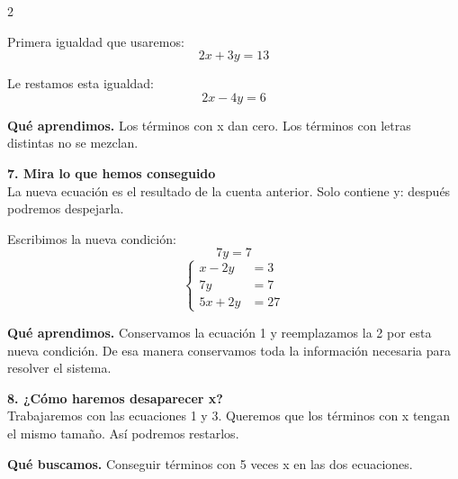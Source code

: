 \documentclass[11pt,a4paper,landscape]{article}
\begin{document}
\begin{multicols*}{2}
\begin{minipage}{\linewidth}
\par{}\par\smallskip
\par\smallskip Primera igualdad que usaremos:
\[2x + 3y = 13\]
\par\smallskip Le restamos esta igualdad:
\[2x - 4y = 6\]
\par\smallskip\textbf{Qué aprendimos.} Los términos con x dan cero. Los términos con letras distintas no se mezclan.
\end{minipage}\par\medskip
\noindent\begin{minipage}{\linewidth}\textbf{7. Mira lo que hemos conseguido}\\[2pt]La nueva ecuación es el resultado de la cuenta anterior. Solo contiene y: después podremos despejarla.
\par\smallskip Escribimos la nueva condición:
\[7y = 7\]
\[\left\{\begin{aligned}x - 2y &= 3\\7y &= 7\\5x + 2y &= 27\end{aligned}\right.\]
\par\smallskip\textbf{Qué aprendimos.} Conservamos la ecuación 1 y reemplazamos la 2 por esta nueva condición. De esa manera conservamos toda la información necesaria para resolver el sistema.
\end{minipage}\par\medskip
\noindent\begin{minipage}{\linewidth}\textbf{8. ¿Cómo haremos desaparecer x?}\\[2pt]Trabajaremos con las ecuaciones 1 y 3. Queremos que los términos con x tengan el mismo tamaño. Así podremos restarlos.
\par\smallskip\textbf{Qué buscamos.} Conseguir términos con 5 veces x en las dos ecuaciones.

\end{minipage}
\end{multicols*}
\end{document}
